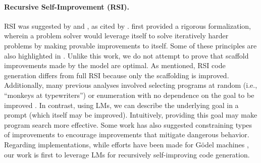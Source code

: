 \documentclass{article}
\begin{document}
\paragraph{Recursive Self-Improvement (RSI).}
RSI was suggested by \citet{minsky_marvin_artificial_1966} and \citet{good1966speculations}, as cited by \citet{yampolskiy2015seed}. 
\citet{schmidhuber2003godel} first provided a rigorous formalization, wherein a problem solver would leverage itself to solve iteratively harder problems by making provable improvements to itself. Some of these principles are also highlighted in \citet{schmidhuber1987evolutionary}. Unlike this work, we do not attempt to prove that scaffold improvements made by the model are optimal. As mentioned, RSI code generation differs from full RSI because only the scaffolding is improved. Additionally, many previous analyses involved selecting programs at random (i.e., ``monkeys at typewriters'') or enumeration
with no dependence on the goal to be improved \citep{levin1973universal}. In contrast, using LMs, we can describe the underlying goal in a prompt (which itself may be improved). Intuitively, providing this goal may make program search more effective.  
Some work has also suggested constraining types of improvements \citep{nivel2013bounded,steunebrink2016growing} to encourage improvements that mitigate dangerous behavior. Regarding implementations, while efforts have been made for G\"odel machines \citep{hall2007self,steunebrink2012towards}, our work is first to leverage LMs for recursively self-improving code generation.
\end{document}
